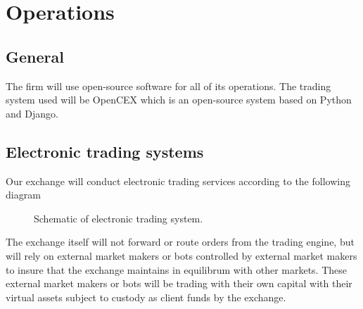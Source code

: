 \chapter{Operations}

\section{General}
The firm will use open-source software for all of its operations.  The
trading system used will be OpenCEX which is an open-source system
based on Python and Django.

\section{Electronic trading systems}
Our exchange will conduct electronic trading services according to the
following diagram
\begin{figure}
  \begin{adjustbox}{center}
\end{adjustbox}
\caption{Schematic of electronic trading system.}
\end{figure}

The exchange itself will not forward or route orders from the trading
engine, but will rely on external market makers or bots controlled by
external market makers to insure that the exchange maintains in
equilibrum with other markets.  These external market makers or bots
will be trading with their own capital with their virtual assets
subject to custody as client funds by the exchange.

